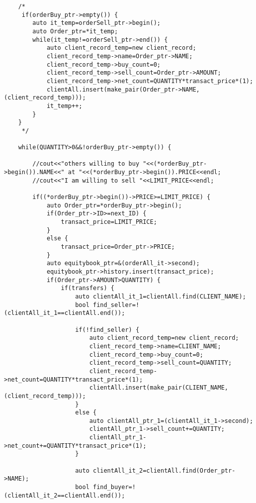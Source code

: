 \documentclass{article}
\begin{document}
\begin{spacing}{1.5}
\begin{lstlisting}
    /*
     if(orderBuy_ptr->empty()) {
        auto it_temp=orderSell_ptr->begin();
        auto Order_ptr=*it_temp;
        while(it_temp!=orderSell_ptr->end()) {
            auto client_record_temp=new client_record;
            client_record_temp->name=Order_ptr->NAME;
            client_record_temp->buy_count=0;
            client_record_temp->sell_count=Order_ptr->AMOUNT;
            client_record_temp->net_count=QUANTITY*transact_price*(1);
            clientAll.insert(make_pair(Order_ptr->NAME, (client_record_temp)));
            it_temp++;
        }
    }
     */

    while(QUANTITY>0&&!orderBuy_ptr->empty()) {

        //cout<<"others willing to buy "<<(*orderBuy_ptr->begin()).NAME<<" at "<<(*orderBuy_ptr->begin()).PRICE<<endl;
        //cout<<"I am willing to sell "<<LIMIT_PRICE<<endl;

        if((*orderBuy_ptr->begin())->PRICE>=LIMIT_PRICE) {
            auto Order_ptr=*orderBuy_ptr->begin();
            if(Order_ptr->ID>=next_ID) {
                transact_price=LIMIT_PRICE;
            }
            else {
                transact_price=Order_ptr->PRICE;
            }
            auto equitybook_ptr=&(orderAll_it->second);
            equitybook_ptr->history.insert(transact_price);
            if(Order_ptr->AMOUNT>QUANTITY) {
                if(transfers) {
                    auto clientAll_it_1=clientAll.find(CLIENT_NAME);
                    bool find_seller=!(clientAll_it_1==clientAll.end());

                    if(!find_seller) {
                        auto client_record_temp=new client_record;
                        client_record_temp->name=CLIENT_NAME;
                        client_record_temp->buy_count=0;
                        client_record_temp->sell_count=QUANTITY;
                        client_record_temp->net_count=QUANTITY*transact_price*(1);
                        clientAll.insert(make_pair(CLIENT_NAME, (client_record_temp)));
                    }
                    else {
                        auto clientAll_ptr_1=(clientAll_it_1->second);
                        clientAll_ptr_1->sell_count+=QUANTITY;
                        clientAll_ptr_1->net_count+=QUANTITY*transact_price*(1);
                    }

                    auto clientAll_it_2=clientAll.find(Order_ptr->NAME);
                    bool find_buyer=!(clientAll_it_2==clientAll.end());


\end{lstlisting}
\end{spacing}
\end{document}
